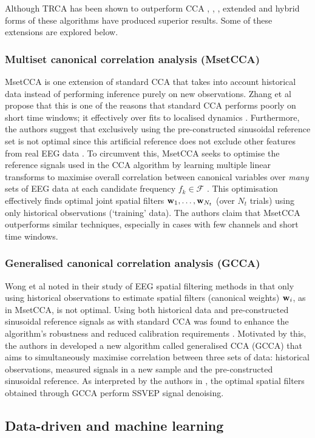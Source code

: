Although TRCA has been shown to outperform CCA \cite{lee-trca-2step}, \cite{miao-hybrid-cca}, \cite{sun-gcca}, extended and hybrid forms of these algorithms have produced superior results. Some of these extensions are explored below.

\subsubsection{Multiset canonical correlation analysis (MsetCCA)}
MsetCCA is one extension of standard CCA that takes into account historical data instead of performing inference purely on new observations. Zhang et al propose that this is one of the reasons that standard CCA performs poorly on short time windows; it effectively over fits to localised dynamics \cite{zhang-mset-cca}. Furthermore, the authors suggest that exclusively using the pre-constructed sinusoidal reference set is not optimal since this artificial reference does not exclude other features from real EEG data \cite{zhang-mset-cca}. To circumvent this, MsetCCA seeks to optimise the reference signals used in the CCA algorithm by learning multiple linear transforms to maximise overall correlation between canonical variables over \textit{many} sets of EEG data at each candidate frequency $f_k \in \mathcal{F}$ \cite{zhang-mset-cca}. This optimisation effectively finds optimal joint spatial filters ${\mathbf{w}}_1, \dots, {\mathbf{w}}_{N_t}$ (over $N_t$ trials) using only historical observations (`training' data). The authors claim that MsetCCA outperforms similar techniques, especially in cases with few channels and short time windows. 

\subsubsection{Generalised canonical correlation analysis (GCCA)}
Wong et al noted in their study of EEG spatial filtering methods in \cite{wong-spatial-filt} that only using historical observations to estimate spatial filters (canonical weights) ${\mathbf{w}}_i$, as in MsetCCA, is not optimal. Using both historical data and pre-constructed sinusoidal reference signals as with standard CCA was found to enhance the algorithm's robustness and reduced calibration requirements \cite{wong-spatial-filt}.  Motivated by this, the authors in \cite{sun-gcca} developed a new algorithm called generalised CCA (GCCA) that aims to simultaneously maximise correlation between three sets of data: historical observations, measured signals in a new sample and the pre-constructed sinusoidal reference. As interpreted by the authors in \cite{sun-gcca}, the optimal spatial filters obtained through GCCA perform SSVEP signal denoising.

\subsection{Data-driven and machine learning}